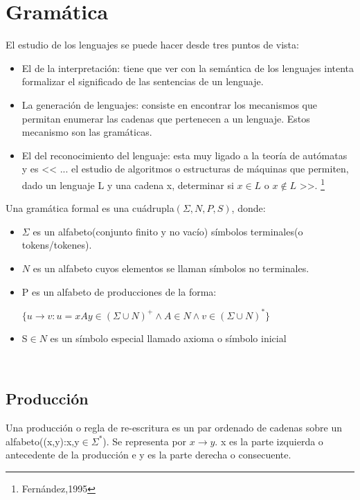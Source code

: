 \section{Gramática}

El estudio de los lenguajes se puede hacer desde tres puntos de vista:
\begin{itemize}
	\item El de la interpretación: tiene que ver con la semántica de los lenguajes intenta formalizar el significado de las sentencias de un lenguaje.
	
	\item La generación de lenguajes: consiste en encontrar los mecanismos que permitan enumerar las cadenas que pertenecen a un lenguaje. Estos mecanismo son las gramáticas.
	
	
	\item El del reconocimiento del lenguaje: esta muy ligado a la teoría de autómatas y es << ... el estudio de algoritmos o estructuras de máquinas que permiten, dado un lenguaje L y una cadena x, determinar si $ x\in L$ o  $x\not\in L$ >>. \footnote{ Fernández,1995} 
	
	
\end{itemize}

Una gramática formal es una cuádrupla$(\Sigma,N,P,S)$, donde:

\begin{itemize}
\item $\Sigma$ es un alfabeto(conjunto finito y no vacío) símbolos terminales(o tokens/tokenes).
\item $N$ es un alfabeto cuyos elementos se llaman símbolos no terminales.
\item P es un alfabeto de producciones de la forma:


$\lbrace u\rightarrow v:  u=xAy\in(\Sigma\cup N)^{+}\wedge A \in N\wedge v\in(\Sigma\cup N)^{*}\rbrace$
\item S$\in N$ es un símbolo especial llamado axioma o símbolo inicial
\end{itemize}

\
\subsection{Producción}
Una producción o regla de re-escritura es un par ordenado de cadenas sobre un alfabeto((x,y):x,y$ \in\Sigma^{\ast}$). Se representa por $x\rightarrow y$. x es la parte izquierda o antecedente de la producción e y es la parte derecha o consecuente.
